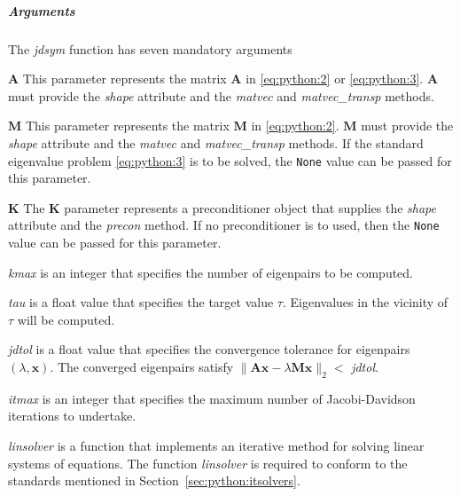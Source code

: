 \documentclass[a4paper]{article}
\newcommand{\mat}[1]{\ensuremath{\boldsymbol{#1}}}
\newcommand{\vect}[1]{\ensuremath{\mathbf{#1}}}
\newenvironment{arglist} {\begin{list}{}{\setlength{\leftmargin}{4em}\setlength{\itemsep}{0cm}\setlength{\labelwidth}{3em}}}
  {\end{list}}
\begin{document}
\subparagraph{Arguments}
%
The \textit{jdsym} function has seven mandatory arguments
\begin{arglist}
\item[$\mat{A}$] This parameter represents the matrix
  $\mat{A}$ in \eqref{eq:python:2} or \eqref{eq:python:3}.  $\mat{A}$
  must provide the \textit{shape} attribute and the \textit{matvec}
  and \textit{matvec\_transp} methods.
\item[$\mat{M}$] This parameter represents the matrix $\mat{M}$ in
  \eqref{eq:python:2}.  $\mat{M}$ must provide the \textit{shape}
  attribute and the \textit{matvec} and \textit{matvec\_transp}
  methods. If the standard eigenvalue problem \eqref{eq:python:3} is
  to be solved, the \texttt{None} value can be passed for this
  parameter.
\item[$\mat{K}$] The $\mat{K}$ parameter represents a preconditioner
  object that supplies the \textit{shape} attribute and the
  \textit{precon} method. If no preconditioner is to used, then the
  \texttt{None} value can be passed for this parameter.
\item[\textit{kmax}] is an integer that specifies the number of
  eigenpairs to be computed.
\item[\textit{tau}] is a float value that specifies the target value
  $\tau$. Eigenvalues in the vicinity of $\tau$ will be computed.
\item[\textit{jdtol}] is a float value that specifies the convergence
  tolerance for eigenpairs $(\lambda,\vect{x})$. The converged
  eigenpairs satisfy $\|\mat{A} \vect{x} - \lambda \mat{M}
  \vect{x}\|_2 <{}$ \textit{jdtol}.
\item[\textit{itmax}] is an integer that specifies the maximum number
  of Jacobi-Davidson iterations to undertake.
\item[\textit{linsolver}] is a function that implements an iterative
  method for solving linear systems of equations. The function
  \textit{linsolver} is required to conform to the standards mentioned
  in Section~\ref{sec:python:itsolvers}.
\end{arglist}
\end{document}
